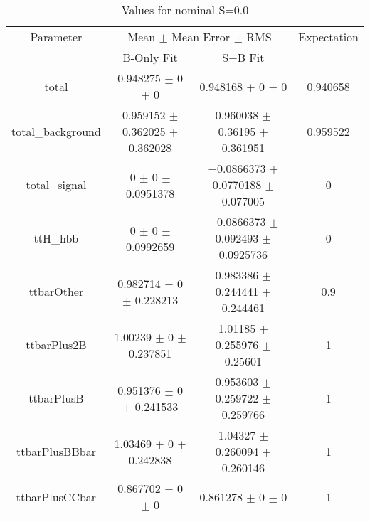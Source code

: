 \begin{table}
\centering
\caption{Values for nominal S=0.0}
\begin{tabular}{cccc}
\toprule
Parameter & \multicolumn{2}{c}{Mean $\pm$ Mean Error $\pm$ RMS} & Expectation\\
 & B-Only Fit & S+B Fit & \\
\midrule
total & \num{0.948275} $\pm$ \num{0} $\pm$ \num{0} & \num{0.948168} $\pm$ \num{0} $\pm$ \num{0} & \num{0.940658}\\
total\_background & \num{0.959152} $\pm$ \num{0.362025} $\pm$ \num{0.362028} & \num{0.960038} $\pm$ \num{0.36195} $\pm$ \num{0.361951} & \num{0.959522}\\
total\_signal & \num{0} $\pm$ \num{0} $\pm$ \num{0.0951378} & \num{-0.0866373} $\pm$ \num{0.0770188} $\pm$ \num{0.077005} & \num{0}\\
ttH\_hbb & \num{0} $\pm$ \num{0} $\pm$ \num{0.0992659} & \num{-0.0866373} $\pm$ \num{0.092493} $\pm$ \num{0.0925736} & \num{0}\\
ttbarOther & \num{0.982714} $\pm$ \num{0} $\pm$ \num{0.228213} & \num{0.983386} $\pm$ \num{0.244441} $\pm$ \num{0.244461} & \num{0.9}\\
ttbarPlus2B & \num{1.00239} $\pm$ \num{0} $\pm$ \num{0.237851} & \num{1.01185} $\pm$ \num{0.255976} $\pm$ \num{0.25601} & \num{1}\\
ttbarPlusB & \num{0.951376} $\pm$ \num{0} $\pm$ \num{0.241533} & \num{0.953603} $\pm$ \num{0.259722} $\pm$ \num{0.259766} & \num{1}\\
ttbarPlusBBbar & \num{1.03469} $\pm$ \num{0} $\pm$ \num{0.242838} & \num{1.04327} $\pm$ \num{0.260094} $\pm$ \num{0.260146} & \num{1}\\
ttbarPlusCCbar & \num{0.867702} $\pm$ \num{0} $\pm$ \num{0} & \num{0.861278} $\pm$ \num{0} $\pm$ \num{0} & \num{1}\\
\bottomrule
\end{tabular}
\end{table}